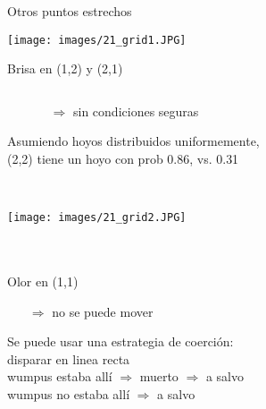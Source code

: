 \begin{frame}{Otros puntos estrechos}
	\begin{minipage}{0.35\textwidth}%
		\quad\quad\quad \texttt{[image: images/21\_grid1.JPG]} 
	\end{minipage}%
	\hfill%
	\begin{minipage}{0.65\textwidth}\raggedright
		{\footnotesize %
			\qquad Brisa en (1,2) y (2,1)
			\begin{itemize}
				\item[$­$]
				\begin{itemize}
					\item[$\Rightarrow$]sin condiciones seguras
				\end{itemize}
			\end{itemize}
			\qquad Asumiendo hoyos distribuidos uniformemente,
			\\
			\qquad (2,2) tiene un hoyo con prob 0.86, vs. 0.31
		}
	\end{minipage}
	\\
	\begin{minipage}{0.35\textwidth}%
		\quad\quad\quad \texttt{[image: images/21\_grid2.JPG]} 
	\end{minipage}%
	\hfill%
	\begin{minipage}{0.65\textwidth}\raggedright
		{\footnotesize %
			\quad
			\\~\\
			Olor en (1,1)
			\begin{itemize}
				\item[$\Rightarrow$]no se puede mover
			\end{itemize}
			Se puede usar una estrategia de \textcolor{DarkPurple}{coerción}:
			\\
			\quad disparar en linea recta
			\\
			\quad wumpus estaba allí {$\Rightarrow$} muerto {$\Rightarrow$} a salvo
			\\
			\quad wumpus no estaba allí {$\Rightarrow$} a salvo
		}
	\end{minipage}
\end{frame}